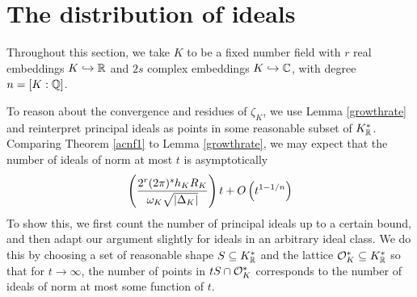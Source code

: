 \documentclass[11pt]{report}
\begin{document}
\section{The distribution of ideals}
Throughout this section, we take $K$ to be a fixed number field with $r$ real embeddings $K \hookrightarrow \mathbb{R}$ and $2s$ complex embeddings $K \hookrightarrow \mathbb{C}$, with degree $n = [K : \mathbb{Q}]$.

To reason about the convergence and residues of $\zeta_K$, we use Lemma \ref{growthrate} and reinterpret principal ideals as points in some reasonable subset of $K_{\mathbb{R}}^*$. Comparing Theorem \ref{acnf1} to Lemma \ref{growthrate}, we may expect that the number of ideals of norm at most $t$ is asymptotically
$$
    \left(  \frac{2^r(2\pi)^sh_KR_K}{\omega_K\sqrt{\left| \Delta_K \right|}}  \right)t + O\left(  t^{1 - 1/n}  \right)
$$
To show this, we first count the number of principal ideals up to a certain bound, and then adapt our argument slightly for ideals in an arbitrary ideal class. We do this by choosing a set of reasonable shape $S \subseteq K_{\mathbb{R}}^*$ and the lattice $\mathcal{O}_K^* \subseteq K_{\mathbb{R}}^*$ so that for $t \to \infty$, the number of points in $tS \cap \mathcal{O}_K^*$ corresponds to the number of ideals of norm at most some function of $t$.
\end{document}
